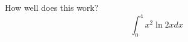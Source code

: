 \documentclass{article}
\begin{document}
How well does this work?
$$\int_0^4 x^2 \ln{2x}dx$$
\end{document}
